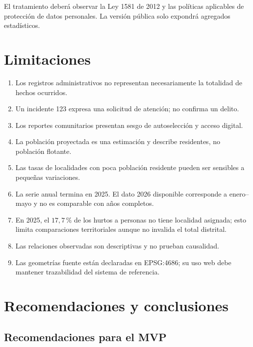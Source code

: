 \documentclass[11pt,letterpaper,oneside]{report}
\begin{document}
El tratamiento deberá observar la Ley 1581 de 2012 y las políticas aplicables de protección de datos personales. La versión pública solo expondrá agregados estadísticos.

\chapter{Limitaciones}

\begin{enumerate}
  \item Los registros administrativos no representan necesariamente la totalidad de hechos ocurridos.
  \item Un incidente 123 expresa una solicitud de atención; no confirma un delito.
  \item Los reportes comunitarios presentan sesgo de autoselección y acceso digital.
  \item La población proyectada es una estimación y describe residentes, no población flotante.
  \item Las tasas de localidades con poca población residente pueden ser sensibles a pequeñas variaciones.
  \item La serie anual termina en 2025. El dato 2026 disponible corresponde a enero--mayo y no es comparable con años completos.
  \item En 2025, el \(17{,}7\,\%\) de los hurtos a personas no tiene localidad asignada; esto limita comparaciones territoriales aunque no invalida el total distrital.
  \item Las relaciones observadas son descriptivas y no prueban causalidad.
  \item Las geometrías fuente están declaradas en EPSG:4686; su uso web debe mantener trazabilidad del sistema de referencia.
\end{enumerate}

\chapter{Recomendaciones y conclusiones}\label{chap:recomendaciones}

\section{Recomendaciones para el MVP}
\end{document}
